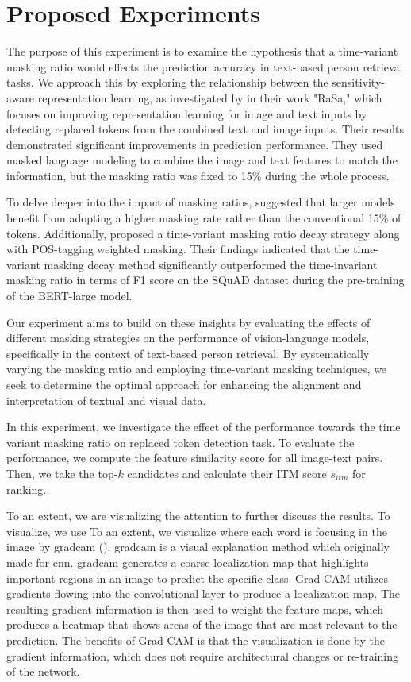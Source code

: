 \chapter{Proposed Experiments}

The purpose of this experiment is to examine the hypothesis that a time-variant masking ratio would effects the prediction accuracy in text-based person retrieval tasks. We approach this by exploring the relationship between the sensitivity-aware representation learning, as investigated by \cite{Bai2023RaSaRA} in their work "RaSa," which focuses on improving representation learning for image and text inputs by detecting replaced tokens from the combined text and image inputs. Their results demonstrated significant improvements in prediction performance. They used masked language modeling to combine the image and text features to match the information, but the masking ratio was fixed to 15\% during the whole process.

To delve deeper into the impact of masking ratios, \cite{wettig-etal-2023-mask} suggested that larger models benefit from adopting a higher masking rate rather than the  conventional 15\% of tokens. Additionally, \cite{yang2023learningbettermaskingbetter} proposed a time-variant masking ratio decay strategy along with POS-tagging weighted masking. Their findings indicated that the time-variant masking decay method significantly outperformed the time-invariant masking ratio in terms of F1 score on the SQuAD dataset during the pre-training of the BERT-large model.

Our experiment aims to build on these insights by evaluating the effects of different masking strategies on the performance of vision-language models, specifically in the context of text-based person retrieval. By systematically varying the masking ratio and employing time-variant masking techniques, we seek to determine the optimal approach for enhancing the alignment and interpretation of textual and visual data.

In this experiment, we investigate the effect of the performance towards the time variant masking ratio on replaced token detection task. To evaluate the performance, we compute the feature similarity score for all image-text pairs. Then, we take the top-$k$ candidates and calculate their ITM score $s_{itm}$ for ranking. 

To an extent, we are visualizing the attention to further discuss the results. To visualize, we use 
To an extent, we visualize where each word is focusing in the image by \acrfull{gradcam} (\cite{gradcam}).
\acrshort{gradcam} is a visual explanation method which originally made for \acrfull{cnn}. \acrshort{gradcam} generates a coarse localization map that highlights important regions in an image to predict the specific class. Grad-CAM utilizes gradients flowing into the convolutional layer to produce a localization map. The resulting gradient information is then used to weight the feature maps, which produces a heatmap that shows areas of the image that are most relevant to the prediction. The benefits of Grad-CAM is that the visualization is done by the gradient information, which does not require architectural changes or re-training of the network.


